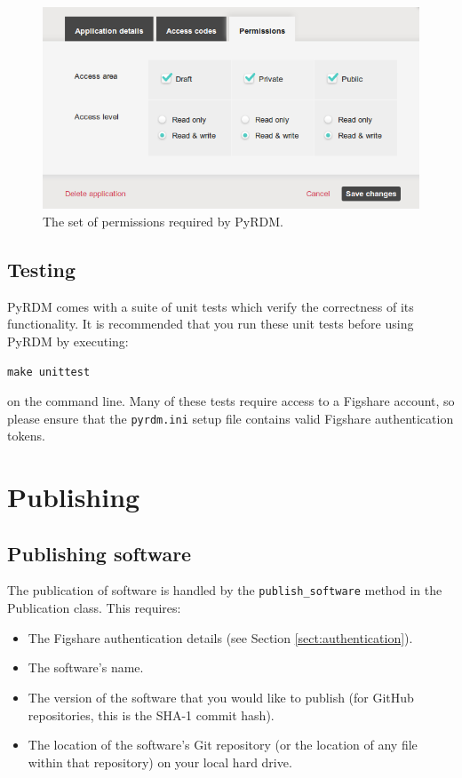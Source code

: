 \documentclass[a4paper,11pt]{report}
\begin{document}
\begin{figure}
  \centering
  \includegraphics[width=1\columnwidth]{images/permissions.png}
  \caption{The set of permissions required by PyRDM.}
  \label{fig:permissions}
\end{figure}

\section{Testing}
PyRDM comes with a suite of unit tests which verify the correctness of its functionality. It is recommended that you run these unit tests before using PyRDM by executing:

  \texttt{make unittest}
  
on the command line. Many of these tests require access to a Figshare account, so please ensure that the \texttt{pyrdm.ini} setup file contains valid Figshare authentication tokens.

\chapter{Publishing}

\section{Publishing software}
The publication of software is handled by the \texttt{publish\_software} method in the Publication class. This requires:

\begin{itemize}
  \item The Figshare authentication details (see Section \ref{sect:authentication}).
  \item The software's name.
  \item The version of the software that you would like to publish (for GitHub repositories, this is the SHA-1 commit hash).
  \item The location of the software's Git repository (or the location of any file within that repository) on your local hard drive.
\end{itemize}
\end{document}
